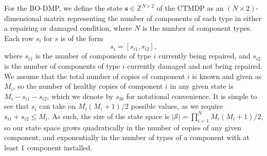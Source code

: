 \documentclass[11pt,authoryear,a4paper]{article}
\newcommand{\ZZ}{\mathbb{Z}}
\newcommand{\EE}{\mathbb{E}}
\theoremstyle{definition}
\begin{document}

For the BO-DMP, we define the state $\mathbf{s}\in\ZZ^{N\times2}$ of the CTMDP as an $(N\times 2)$-dimensional matrix representing the number of components of each type in either a repairing or damaged condition, where $N$ is the number of component types. Each row $s_i$ for $s$ is of the form
$$s_{i} = [s_{i1},s_{i2}],$$
where $s_{i1}$ is the number of components of type $i$ currently being repaired, and $s_{i2}$ is the number of components of type $i$ currently damaged and not being repaired. We assume that the total number of copies of component $i$ is known and given as $M_i$, so the number of healthy copies of component $i$ in any given state is $M_i - s_{i1} - s_{i2}$, which we denote by $s_{i0}$ for notational convenience. It is simple to see that $s_i$ can take on $M_i(M_i + 1)/2$ possible values, as we require $s_{i1} + s_{i2} \leq M_i$.
As such, the size of the state space is $|\mathcal{S}| = \prod_{i=1}^N M_i(M_i + 1)/2$, so our state space grows quadratically in the number of copies of any given component, and exponentially in the number of types of a component with at least 1 component installed.
\end{document}
